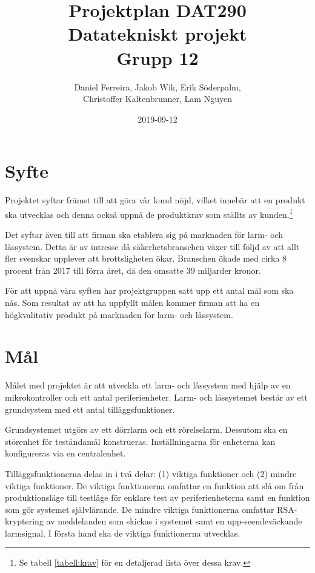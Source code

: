 \documentclass[a4paper]{article}
\begin{document}
\title{ \textbf{Projektplan DAT290} \\ Datatekniskt projekt \\ Grupp 12}
\author{Daniel Ferreira, Jakob Wik, Erik Söderpalm,\\Christoffer Kaltenbrunner, Lam Nguyen}
\date{2019-09-12}
\maketitle

\newpage
\tableofcontents

\newpage
{}

\section{Syfte}
\label{sec:syfte}

Projektet syftar främst till att göra vår kund nöjd, vilket innebär att en produkt ska utvecklas och denna också uppnå de produktkrav som ställts av kunden.\footnote{Se tabell \ref{tabell:krav} för en detaljerad lista över dessa krav.}

Det syftar även till att firman ska etablera sig på marknaden för larm- och låssystem. Detta är av intresse då säkerhetsbranschen växer till följd av att allt fler svenskar upplever att brottsligheten ökar. Branschen ökade med cirka 8 procent från 2017 till förra året, då den omsatte 39 miljarder kronor\cite{sverigesRadio}.

För att uppnå våra syften har projektgruppen satt upp ett antal mål som ska nås. Som resultat av att ha uppfyllt målen kommer firman att ha en högkvalitativ produkt på marknaden för larm- och låssystem.

\section{Mål}
\label{sec:mål}

Målet med projektet är att utveckla ett larm- och låssystem med hjälp av en mikrokontroller och ett antal periferienheter.
Larm- och låssystemet består av ett grundsystem med ett antal tilläggsfunktioner.

Grundsystemet utgörs av ett dörrlarm och ett rörelselarm. Dessutom ska en störenhet för teständamål konstrueras. Inställningarna för enheterna kan konfigureras via en centralenhet.

Tilläggsfunktionerna delas in i två delar: (1) viktiga funktioner och (2) mindre viktiga funktioner. De viktiga funktionerna omfattar en funktion att slå om från produktionsläge till testläge för enklare test av periferienheterna samt en funktion som gör systemet självlärande.  De mindre viktiga funktionerna omfattar RSA-kryptering av meddelanden som skickas i systemet samt en upp-seendeväckande larmsignal.
I första hand ska de viktiga funktionerna utvecklas.
\end{document}
